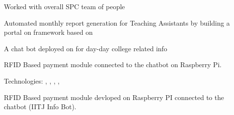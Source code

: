 \documentclass[]{deedy-resume-openfont}
\begin{document}
\begin{minipage}[t]{0.67\textwidth}
\begin{tightemize}
\item Worked with overall SPC team of  people



    
\end{tightemize}

\begin{tightemize}
\item Automated monthly report generation for Teaching Assistants by building a portal on  framework based on 
\end{tightemize}

\begin{tightemize}
\item A chat bot deployed on  for day-day college related info
\item RFID Based payment module connected to the chatbot on Raspberry Pi.
\item Technologies: , ,  , , 
\end{tightemize}

\begin{tightemize}
\item RFID Based payment module devloped on Raspberry PI connected to the chatbot (IITJ Info Bot).
\end{tightemize}




\end{minipage}
\end{document}
